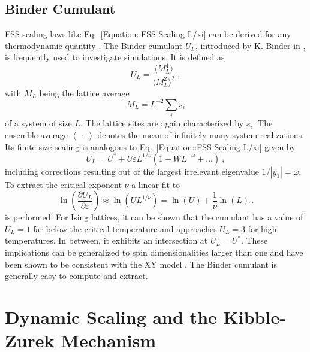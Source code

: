 	\subsection{Binder Cumulant} \label{Sec::Binder-Cumulant}
	FSS scaling laws like Eq.~\eqref{Equation::FSS-Scaling-L/xi} can be derived for any thermodynamic quantity \cite{pelissetto2002critical, blote1995ising}. The Binder cumulant $U_L$, introduced by K. Binder in \cite{binder1981finite}, is frequently used to investigate simulations. It is defined as
	\begin{equation} \label{Eq::Def-Binder-Cum}
		U_L =	\frac{\langle M_L^4 \rangle}{\langle M_L^2 \rangle^2}~,
	\end{equation}
	with $M_L$ being the lattice average 
	\begin{equation} \label{Eq::lattice-average}
		M_L	=	L^{-2} \sum_i s_i
	\end{equation}
	of a system of size $L$. The lattice sites are again characterized by $s_i$. The ensemble average $\left\langle~\cdot~\right \rangle$ denotes the mean of infinitely many system realizations. Its finite size scaling is analogous to Eq.~\eqref{Equation::FSS-Scaling-L/xi} given by
	\begin{equation}
		U_L =	U^* + U \varepsilon L^{1/\nu} \left(1 + W L^{-\omega} + ...\right)~,
	\end{equation}
	including corrections resulting out of the largest irrelevant eigenvalue $1/|y_1| =	\omega $.
	To extract the critical exponent $\nu$ a linear fit to
	\begin{equation} \label{Eq::FSS-dU_dT}
		\ln \left(\frac{\partial U_L}{\partial \varepsilon}\right) \approx	\ln \left(U L^{1/\nu} \right) =	\ln (U) + \frac{1}{\nu} \ln (L) ~.
	\end{equation}
	is performed. For Ising lattices, it can be shown \cite{binder1981finite} that the cumulant has a value of $U_L=1$ far below the critical temperature and approaches $U_L =	3$ for high temperatures. In between, it exhibits an intersection at $U_L =	U^*$. These implications can be generalized to spin dimensionalities larger than one \cite{binder1981critical} and have been shown to be consistent with the XY model \cite{landau1983non, bernreuther1988investigation}. The Binder cumulant is generally easy to compute and extract.
	\section{Dynamic Scaling and the Kibble-Zurek Mechanism} \label{Section::Dynamic-Scaling}
